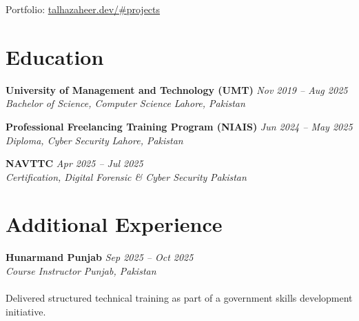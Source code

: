 \documentclass[11pt,a4paper]{article}
\newcommand{\resumeSubheading}[4]{%
  \textbf{#1} \hfill \textit{#2} \\
  \textit{#3} \hfill \textit{#4} \\
}
\begin{document}
\vspace{2pt}

{\small Portfolio: \href{https://talhazaheer.dev/\#projects}{talhazaheer.dev/\#projects}}

\section{Education}

\resumeSubheading{University of Management and Technology (UMT)}{Nov 2019 -- Aug 2025}{Bachelor of Science, Computer Science}{Lahore, Pakistan}

\vspace{4pt}

\resumeSubheading{Professional Freelancing Training Program (NIAIS)}{Jun 2024 -- May 2025}{Diploma, Cyber Security}{Lahore, Pakistan}

\vspace{4pt}

\resumeSubheading{NAVTTC}{Apr 2025 -- Jul 2025}{Certification, Digital Forensic \& Cyber Security}{Pakistan}

\section{Additional Experience}
\resumeSubheading{Hunarmand Punjab}{Sep 2025 -- Oct 2025}{Course Instructor}{Punjab, Pakistan} \\
Delivered structured technical training as part of a government skills development initiative.
\end{document}
